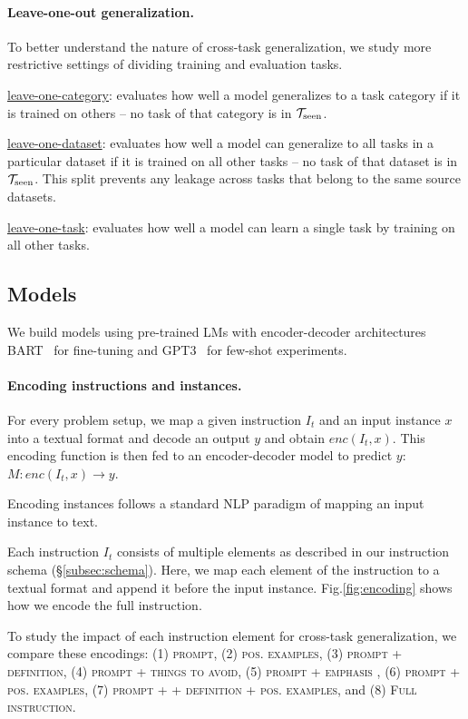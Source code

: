 \paragraph{Leave-one-out generalization.} To better understand the nature of cross-task generalization, we study more restrictive settings of dividing training and evaluation tasks. 

 \ul{leave-one-category}: evaluates how well a model  generalizes to a task category if it is trained on others  -- no task of that category is in $\mathcal{T}_{\textnormal{seen}}$. 

 \ul{leave-one-dataset}: evaluates how well a model can generalize to all tasks in a particular dataset  if it is trained on all other tasks -- no task of that dataset is in $\mathcal{T}_{\textnormal{seen}}$.
This split prevents any leakage across tasks that belong to the same source datasets. 

 \underline{leave-one-task}: evaluates how well a model can learn a single task by training on all other tasks. \\

\subsection{Models}
\label{subsec:models}
We build models using pre-trained LMs with encoder-decoder architectures BART~\cite{lewis2019bart} for fine-tuning and GPT3~\cite{brown2020language} for few-shot experiments. 
 \paragraph{Encoding instructions and instances.} For every problem setup, we map a given instruction $I_t$ and an input instance $x$ into a textual format and decode an output $y$ and obtain $enc(I_t, x)$. This encoding function is then fed to an encoder-decoder model to predict $y$: $M:enc(I_t, x) \rightarrow y$. 

Encoding instances follows a standard NLP paradigm of mapping an input instance to text. 

Each instruction $I_t$ consists of multiple elements as described in our instruction schema (\S\ref{subsec:schema}). Here, we map each element of the instruction to a textual format and append it before the input instance.  Fig.\ref{fig:encoding} shows how we encode the full instruction. 

To study the impact of each instruction element for cross-task generalization, we compare these encodings: (1) \textsc{prompt}, (2) \textsc{pos. examples}, (3) \textsc{prompt + definition},  (4) \textsc{prompt + things to avoid},  (5) \textsc{prompt + emphasis} , (6) \textsc{prompt + pos. examples}, (7) \textsc{prompt + + definition + pos. examples}, and (8) \textsc{Full instruction}. 

